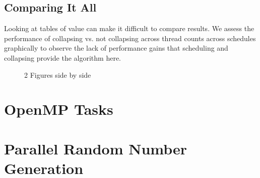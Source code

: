 \documentclass{article}
\begin{document}
\subsection{Comparing It All}
Looking at tables of value can make it difficult to compare results. We assess 
the performance of collapsing vs. not collapsing across thread counts across schedules 
graphically to observe the lack of performance gains that scheduling and collapsing provide 
the algorithm here.

\begin{figure}%
    \centering
    \qquad
    \caption{2 Figures side by side}%
    \label{fig:example}%
\end{figure}

\section{OpenMP Tasks}

\section{Parallel Random Number Generation}
\end{document}
